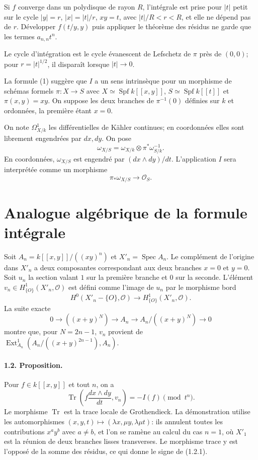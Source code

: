 \documentclass[11pt]{article}
\DeclareMathOperator{\Spec}{Spec}
\DeclareMathOperator{\Spf}{Spf}
\DeclareMathOperator{\Ext}{Ext}
\DeclareMathOperator{\Tr}{Tr}
\newcommand{\OO}{\mathcal O}
\begin{document}
Si $f$ converge dans un polydisque de rayon $R$, l'intégrale est prise pour $|t|$ petit sur le cycle $|y|=r$, $|x|=|t|/r$, $xy=t$, avec $|t|/R<r<R$, et elle ne dépend pas de $r$. Développer $f(t/y,y)$ puis appliquer le théorème des résidus ne garde que les termes $a_{n,n}t^n$.

Le cycle d'intégration est le cycle évanescent de Lefschetz de $\pi$ près de $(0,0)$; pour $r=|t|^{1/2}$, il disparaît lorsque $|t|\to0$.

La formule (1) suggère que $I$ a un sens intrinsèque pour un morphisme de schémas formels $\pi:X\to S$ avec $X\simeq\Spf k[[x,y]]$, $S\simeq\Spf k[[t]]$ et $\pi(x,y)=xy$. On suppose les deux branches de $\pi^{-1}(0)$ définies sur $k$ et ordonnées, la première étant $x=0$.

On note $\Omega^1_{X/k}$ les différentielles de Kähler continues; en coordonnées elles sont librement engendrées par $dx,dy$. On pose
\[
 \omega_{X/S}=\omega_{X/k}\otimes\pi^*\omega_{S/k}^{-1}.
\]
En coordonnées, $\omega_{X/S}$ est engendré par $(dx\wedge dy)/dt$. L'application $I$ sera interprétée comme un morphisme
\[
 \pi_*\omega_{X/S}\to\OO_S.
\]

\section{Analogue algébrique de la formule intégrale}

Soit $A_n=k[[x,y]]/((xy)^n)$ et $X'_n=\Spec A_n$. Le complément de l'origine dans $X'_n$ a deux composantes correspondant aux deux branches $x=0$ et $y=0$. Soit $u_n$ la section valant $1$ sur la première branche et $0$ sur la seconde. L'élément $v_n\in H^1_{\{O\}}(X'_n,\OO)$ est défini comme l'image de $u_n$ par le morphisme bord
\[
 H^0(X'_n-\{O\},\OO)\to H^1_{\{O\}}(X'_n,\OO).
\]
La suite exacte
\[
 0\to((x+y)^N)\to A_n\to A_n/((x+y)^N)\to0
\]
montre que, pour $N=2n-1$, $v_n$ provient de $\Ext^1_{A_n}(A_n/((x+y)^{2n-1}),A_n)$.

\paragraph{1.2. Proposition.} Pour $f\in k[[x,y]]$ et tout $n$, on a
\begin{equation}\tag{1.2.1}
 \Tr\left(f\frac{dx\wedge dy}{dt},v_n\right)=-I(f)\pmod {t^n}.
\end{equation}
Le morphisme $\Tr$ est la trace locale de Grothendieck. La démonstration utilise les automorphismes $(x,y,t)\mapsto(\lambda x,\mu y,\lambda\mu t)$: ils annulent toutes les contributions $x^ay^b$ avec $a\ne b$, et l'on se ramène au calcul du cas $n=1$, où $X'_1$ est la réunion de deux branches lisses transverses. Le morphisme trace y est l'opposé de la somme des résidus, ce qui donne le signe de (1.2.1).
\end{document}
